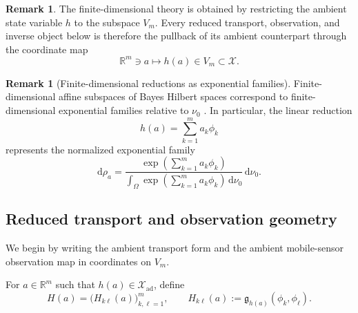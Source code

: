 \documentclass{article}
\theoremstyle{definition}
\newtheorem{remark}[theorem]{Remark}
\renewcommand{\d}{\mathrm{d}}
\begin{document}
\begin{remark}
    \label{rem:finite-dimensional-as-restriction}
    The finite-dimensional theory is obtained by restricting the ambient state variable \(h\) to the
    subspace \(V_m\). Every reduced transport, observation, and inverse object below is therefore the
    pullback of its ambient counterpart through the coordinate map
    \[
        \mathbb R^m\ni a\longmapsto h(a)\in V_m\subset \mathcal X.
    \]
\end{remark}

\begin{remark}[Finite-dimensional reductions as exponential families]
    \label{rem:finite-dimensional-exponential-family}
    Finite-dimensional affine subspaces of Bayes Hilbert spaces
    correspond to finite-dimensional exponential families relative to \(\nu_0\)
    \citep{van_den_boogaart_bayes_2014}. In particular, the linear reduction
    \[
        h(a)=\sum_{k=1}^m a_k\phi_k
    \]
    represents the normalized exponential family
    \[
        \d\rho_a
        =
        \frac{
            \exp\!\left(\sum_{k=1}^m a_k\phi_k\right)
        }{
            \int_\Omega
            \exp\!\left(\sum_{k=1}^m a_k\phi_k\right)
            \,\d\nu_0
        }
        \,\d\nu_0.
    \]
\end{remark}

\subsection{Reduced transport and observation geometry}

We begin by writing the ambient transport form and the ambient mobile-sensor observation map in
coordinates on \(V_m\).

For \(a\in\mathbb R^m\) such that \(h(a)\in \mathcal X_{\mathrm{ad}}\), define
\begin{equation}
    \label{eq:reduced-transport-matrix}
    H(a)=\bigl(H_{k\ell}(a)\bigr)_{k,\ell=1}^m,
    \qquad
    H_{k\ell}(a):=\mathfrak g_{h(a)}(\phi_k,\phi_\ell).
\end{equation}
\end{document}
